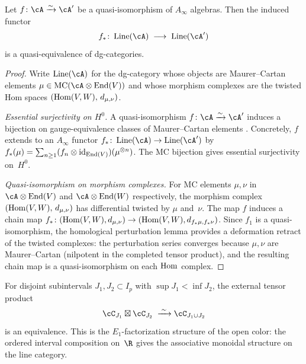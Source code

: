 \begin{proposition}
\label{prop:mc-homotopy-invariance}
Let $f \colon \cA \xrightarrow{\sim} \cA'$ be a quasi-isomorphism
of $A_\infty$ algebras. Then the induced functor
\[
 f_* \colon \operatorname{Line}(\cA)
 \;\longrightarrow\;
 \operatorname{Line}(\cA')
\]
is a quasi-equivalence of dg-categories.
\end{proposition}

\begin{proof}
Write $\operatorname{Line}(\cA)$ for the dg-category whose objects
are Maurer--Cartan elements $\mu \in \MC(\cA \otimes \End(V))$ and
whose morphism complexes are the twisted Hom spaces
$(\mathrm{Hom}(V, W),\, d_{\mu,\nu})$.

\emph{Essential surjectivity on $H^0$.}
A quasi-isomorphism $f \colon \cA \xrightarrow{\sim} \cA'$
induces a bijection on gauge-equivalence classes of
Maurer--Cartan elements
\cite[Theorem~4.6]{KS09}.
Concretely, $f$ extends to an $A_\infty$ functor
$f_* \colon \operatorname{Line}(\cA) \to \operatorname{Line}(\cA')$
by $f_*(\mu) = \sum_{n \ge 1} (f_n \otimes \mathrm{id}_{
\mathrm{End}(V)})(\mu^{\otimes n})$.
The MC bijection gives essential surjectivity on~$H^0$.

\emph{Quasi-isomorphism on morphism complexes.}
For MC elements $\mu, \nu$ in $\cA \otimes \End(V)$
and $\cA \otimes \End(W)$ respectively, the morphism complex
$(\mathrm{Hom}(V, W),\, d_{\mu,\nu})$ has differential twisted by $\mu$
and~$\nu$.
The map $f$ induces a chain map
$f_* \colon (\mathrm{Hom}(V, W), d_{\mu,\nu})
\to (\mathrm{Hom}(V, W), d_{f_*\mu, f_*\nu})$.
Since $f_1$ is a quasi-isomorphism, the homological perturbation
lemma \cite{Berglund15} provides a deformation retract of the
twisted complexes: the perturbation series converges because
$\mu, \nu$ are Maurer--Cartan \textup{(}nilpotent in the
completed tensor product\textup{)}, and the resulting chain map
is a quasi-isomorphism on each $\mathrm{Hom}$ complex.
\end{proof}

\begin{theorem}
\label{thm:e1-factorization-disjoint}
For disjoint subintervals $J_1, J_2 \subset I_p$ with
$\sup J_1 < \inf J_2$, the external tensor product
\[
 \cC_{J_1} \boxtimes \cC_{J_2}
 \;\xrightarrow{\;\sim\;}
 \cC_{J_1 \cup J_2}
\]
is an equivalence. This is the $E_1$-factorization structure of
the open color: the ordered interval composition on~$\R$ gives
the associative monoidal structure on the line category.
\end{theorem}

